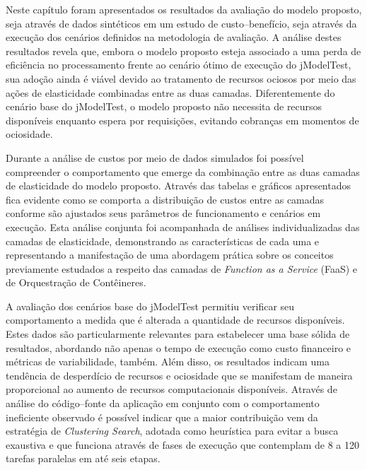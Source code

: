 \documentclass[english,brazilian]{UNISINOSmonografia} %
\begin{document}
Neste capítulo foram apresentados os resultados da avaliação do modelo proposto, seja através de dados sintéticos em um estudo de custo--benefício, seja através da execução dos cenários definidos na metodologia de avaliação.
%
A análise destes resultados revela que, embora o modelo proposto esteja associado a uma perda de eficiência no processamento frente ao cenário ótimo de execução do jModelTest, sua adoção ainda é viável devido ao tratamento de recursos ociosos por meio das ações de elasticidade combinadas entre as duas camadas.
%
Diferentemente do cenário base do jModelTest, o modelo proposto não necessita de recursos disponíveis enquanto espera por requisições, evitando cobranças em momentos de ociosidade.



Durante a análise de custos por meio de dados simulados foi possível compreender o comportamento que emerge da combinação entre as duas camadas de elasticidade do modelo proposto.
%
Através das tabelas e gráficos apresentados fica evidente como se comporta a distribuição de custos entre as camadas conforme são ajustados seus parâmetros de funcionamento e cenários em execução.
%
Esta análise conjunta foi acompanhada de análises individualizadas das camadas de elasticidade, demonstrando as características de cada uma e representando a manifestação de uma abordagem prática sobre os conceitos previamente estudados a respeito das camadas de \textit{Function as a Service} (FaaS) e de Orquestração de Contêineres.



A avaliação dos cenários base do jModelTest permitiu verificar seu comportamento a medida que é alterada a quantidade de recursos disponíveis.
%
Estes dados são particularmente relevantes para estabelecer uma base sólida de resultados, abordando não apenas o tempo de execução como custo financeiro e métricas de variabilidade, também.
%
Além disso, os resultados indicam uma tendência de desperdício de recursos e ociosidade que se manifestam de maneira proporcional ao aumento de recursos computacionais disponíveis.
%
Através de análise do código--fonte da aplicação em conjunto com o comportamento ineficiente observado é possível indicar que a maior contribuição vem da estratégia de \textit{Clustering Search}, adotada como heurística para evitar a busca exaustiva e que funciona através de fases de execução que contemplam de 8 a 120 tarefas paralelas em até seis etapas.


\end{document}
